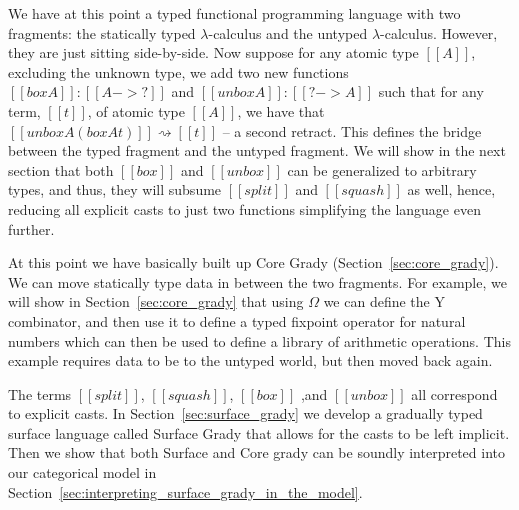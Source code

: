 We have at this point a typed functional programming language with two
fragments: the statically typed $\lambda$-calculus and the untyped
$\lambda$-calculus.  However, they are just sitting side-by-side.  Now
suppose for any atomic type $[[A]]$, excluding the unknown type, we
add two new functions $[[box A]] : [[A -> ?]]$ and $[[unbox A]] : [[?
    -> A]]$ such that for any term, $[[t]]$, of atomic type $[[A]]$,
we have that $[[unbox A (box A t)]] \rightsquigarrow [[t]]$ -- a
second retract.  This defines the bridge between the typed fragment
and the untyped fragment.  We will show in the next section that both
$[[box]]$ and $[[unbox]]$ can be generalized to arbitrary types, and
thus, they will subsume $[[split]]$ and $[[squash]]$ as well, hence,
reducing all explicit casts to just two functions simplifying the
language even further.

At this point we have basically built up Core Grady
(Section~\ref{sec:core_grady}).  We can move statically type data in
between the two fragments.  For example, we will show in
Section~\ref{sec:core_grady} that using $\Omega$ we can define the Y
combinator, and then use it to define a typed fixpoint operator for
natural numbers which can then be used to define a library of
arithmetic operations.  This example requires data to be to the
untyped world, but then moved back again.

The terms $[[split]]$, $[[squash]]$, $[[box]]$ ,and $[[unbox]]$ all
correspond to explicit casts.  In Section~\ref{sec:surface_grady} we
develop a gradually typed surface language called Surface Grady that
allows for the casts to be left implicit.  Then we show that both
Surface and Core grady can be soundly interpreted into our categorical
model in Section~\ref{sec:interpreting_surface_grady_in_the_model}.


